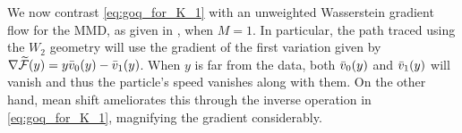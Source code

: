 We now contrast \eqref{eq:goq_for_K_1} with an unweighted Wasserstein gradient flow for the MMD, as given in \citep{ArKoSaGr19}, when $M=1$. In particular, the path traced using the $W_2$ geometry will use the gradient of the first variation given by $\nabla \widetilde{\mathcal{F}}(y) = y \bar{v}_{0}(y) -  \bar{v}_{1}(y)$. When $y$ is far from the data, both $\bar{v}_{0}(y)$ and $\bar{v}_{1}(y)$ will vanish and thus the particle's speed vanishes along with them. On the other hand, mean shift ameliorates this through the inverse operation in \eqref{eq:goq_for_K_1}, magnifying the gradient considerably.





























